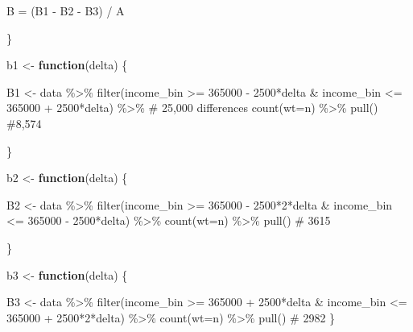 \documentclass[
  letterpaper,
  DIV=11,
  numbers=noendperiod]{scrartcl}
\newenvironment{Shaded}{\begin{snugshade}}{\end{snugshade}}
\newcommand{\AttributeTok}[1]{\textcolor[rgb]{0.40,0.45,0.13}{#1}}
\newcommand{\CommentTok}[1]{\textcolor[rgb]{0.37,0.37,0.37}{#1}}
\newcommand{\ControlFlowTok}[1]{\textcolor[rgb]{0.00,0.23,0.31}{\textbf{#1}}}
\newcommand{\DecValTok}[1]{\textcolor[rgb]{0.68,0.00,0.00}{#1}}
\newcommand{\FunctionTok}[1]{\textcolor[rgb]{0.28,0.35,0.67}{#1}}
\newcommand{\NormalTok}[1]{\textcolor[rgb]{0.00,0.23,0.31}{#1}}
\newcommand{\OtherTok}[1]{\textcolor[rgb]{0.00,0.23,0.31}{#1}}
\newcommand{\SpecialCharTok}[1]{\textcolor[rgb]{0.37,0.37,0.37}{#1}}
\begin{document}
\begin{Shaded}
\begin{Highlighting}[]
\NormalTok{B }\OtherTok{=}\NormalTok{ (B1 }\SpecialCharTok{{-}}\NormalTok{ B2 }\SpecialCharTok{{-}}\NormalTok{ B3) }\SpecialCharTok{/}\NormalTok{ A}

\NormalTok{\}}

\NormalTok{b1 }\OtherTok{\textless{}{-}} \ControlFlowTok{function}\NormalTok{(delta) \{}

\NormalTok{B1  }\OtherTok{\textless{}{-}}\NormalTok{ data }\SpecialCharTok{\%\textgreater{}\%} 
  \FunctionTok{filter}\NormalTok{(income\_bin }\SpecialCharTok{\textgreater{}=} \DecValTok{365000} \SpecialCharTok{{-}} \DecValTok{2500}\SpecialCharTok{*}\NormalTok{delta }\SpecialCharTok{\&}\NormalTok{ income\_bin }\SpecialCharTok{\textless{}=} \DecValTok{365000} \SpecialCharTok{+} \DecValTok{2500}\SpecialCharTok{*}\NormalTok{delta) }\SpecialCharTok{\%\textgreater{}\%}  \CommentTok{\# 25,000 differences}
  \FunctionTok{count}\NormalTok{(}\AttributeTok{wt=}\NormalTok{n) }\SpecialCharTok{\%\textgreater{}\%} 
  \FunctionTok{pull}\NormalTok{() }\CommentTok{\#8,574}

\NormalTok{\}}

\NormalTok{b2 }\OtherTok{\textless{}{-}} \ControlFlowTok{function}\NormalTok{(delta) \{}

\NormalTok{B2 }\OtherTok{\textless{}{-}}\NormalTok{ data }\SpecialCharTok{\%\textgreater{}\%} 
  \FunctionTok{filter}\NormalTok{(income\_bin }\SpecialCharTok{\textgreater{}=} \DecValTok{365000} \SpecialCharTok{{-}} \DecValTok{2500}\SpecialCharTok{*}\DecValTok{2}\SpecialCharTok{*}\NormalTok{delta }\SpecialCharTok{\&}\NormalTok{ income\_bin }\SpecialCharTok{\textless{}=} \DecValTok{365000} \SpecialCharTok{{-}} \DecValTok{2500}\SpecialCharTok{*}\NormalTok{delta) }\SpecialCharTok{\%\textgreater{}\%} 
  \FunctionTok{count}\NormalTok{(}\AttributeTok{wt=}\NormalTok{n) }\SpecialCharTok{\%\textgreater{}\%} 
  \FunctionTok{pull}\NormalTok{() }\CommentTok{\# 3615}

\NormalTok{\}}

\NormalTok{b3 }\OtherTok{\textless{}{-}} \ControlFlowTok{function}\NormalTok{(delta) \{}

\NormalTok{B3 }\OtherTok{\textless{}{-}}\NormalTok{ data }\SpecialCharTok{\%\textgreater{}\%} 
  \FunctionTok{filter}\NormalTok{(income\_bin }\SpecialCharTok{\textgreater{}=} \DecValTok{365000} \SpecialCharTok{+} \DecValTok{2500}\SpecialCharTok{*}\NormalTok{delta }\SpecialCharTok{\&}\NormalTok{ income\_bin }\SpecialCharTok{\textless{}=} \DecValTok{365000} \SpecialCharTok{+} \DecValTok{2500}\SpecialCharTok{*}\DecValTok{2}\SpecialCharTok{*}\NormalTok{delta) }\SpecialCharTok{\%\textgreater{}\%} 
  \FunctionTok{count}\NormalTok{(}\AttributeTok{wt=}\NormalTok{n) }\SpecialCharTok{\%\textgreater{}\%} 
  \FunctionTok{pull}\NormalTok{() }\CommentTok{\# 2982}
\NormalTok{\}}


\end{Highlighting}
\end{Shaded}
\end{document}
